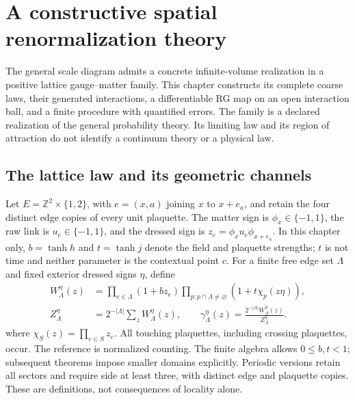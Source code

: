 \chapter{A constructive spatial renormalization theory}
\label{ch:constructive-spatial-rg}

The general scale diagram admits a concrete infinite-volume realization in a
positive lattice gauge--matter family. This chapter constructs its complete
coarse laws, their generated interactions, a differentiable RG map on an open
interaction ball, and a finite procedure with quantified errors. The family is
a declared realization of the general probability theory. Its limiting law and
its region of attraction do not identify a continuum theory or a physical law.

\section{The lattice law and its geometric channels}
\label{sec:rg-spatial-source}

Let \(E=\mathbb Z^2\times\{1,2\}\), with \(e=(x,a)\) joining \(x\) to
\(x+e_a\), and retain the four distinct edge copies of every unit plaquette.
The matter sign is \(\phi_x\in\{-1,1\}\), the raw link is \(u_e\in\{-1,1\}\),
and the dressed sign is \(z_e=\phi_xu_e\phi_{x+e_a}\). In this chapter only,
\(b=\tanh h\) and \(t=\tanh j\) denote the field and plaquette strengths;
\(t\) is not time and neither parameter is the contextual point \(c\).
For a finite free edge set \(\Lambda\) and fixed exterior dressed signs
\(\eta\), define
\begin{equation}
 \begin{aligned}
 W_\Lambda^\eta(z)&=\prod_{e\in\Lambda}(1+bz_e)
 \prod_{p:p\cap\Lambda\ne\varnothing}(1+t\chi_p(z\eta)),\\
 Z_\Lambda^\eta&=2^{-|\Lambda|}\sum_zW_\Lambda^\eta(z),\qquad
 \gamma_\Lambda^\eta(z)=\frac{2^{-|\Lambda|}W_\Lambda^\eta(z)}{Z_\Lambda^\eta}.
 \end{aligned}
 \label{eq:rg-spatial-source-law}
\end{equation}
where \(\chi_S(z)=\prod_{e\in S}z_e\). All touching plaquettes, including
crossing plaquettes, occur. The reference is normalized counting. The finite
algebra allows \(0\le b,t<1\); subsequent theorems impose smaller domains
explicitly. Periodic versions retain all sectors and require side at least
three, with distinct edge and plaquette copies. These are definitions, not
consequences of locality alone. 

